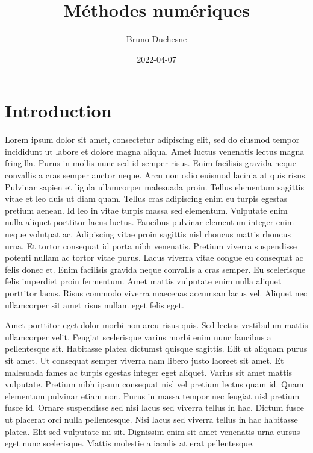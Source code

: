 \documentclass[
]{book}
\title{Méthodes numériques}
\author{Bruno Duchesne}
\date{2022-04-07}
\theoremstyle{definition}
\theoremstyle{definition}
\theoremstyle{definition}
\theoremstyle{definition}
\theoremstyle{remark}
\begin{document}
\maketitle

{
\setcounter{tocdepth}{1}
\tableofcontents
}
\hypertarget{introduction}{%
\chapter*{Introduction}\label{introduction}}

Lorem ipsum dolor sit amet, consectetur adipiscing elit, sed do eiusmod tempor incididunt ut labore et dolore magna aliqua. Amet luctus venenatis lectus magna fringilla. Purus in mollis nunc sed id semper risus. Enim facilisis gravida neque convallis a cras semper auctor neque. Arcu non odio euismod lacinia at quis risus. Pulvinar sapien et ligula ullamcorper malesuada proin. Tellus elementum sagittis vitae et leo duis ut diam quam. Tellus cras adipiscing enim eu turpis egestas pretium aenean. Id leo in vitae turpis massa sed elementum. Vulputate enim nulla aliquet porttitor lacus luctus. Faucibus pulvinar elementum integer enim neque volutpat ac. Adipiscing vitae proin sagittis nisl rhoncus mattis rhoncus urna. Et tortor consequat id porta nibh venenatis. Pretium viverra suspendisse potenti nullam ac tortor vitae purus. Lacus viverra vitae congue eu consequat ac felis donec et. Enim facilisis gravida neque convallis a cras semper. Eu scelerisque felis imperdiet proin fermentum. Amet mattis vulputate enim nulla aliquet porttitor lacus. Risus commodo viverra maecenas accumsan lacus vel. Aliquet nec ullamcorper sit amet risus nullam eget felis eget.

Amet porttitor eget dolor morbi non arcu risus quis. Sed lectus vestibulum mattis ullamcorper velit. Feugiat scelerisque varius morbi enim nunc faucibus a pellentesque sit. Habitasse platea dictumst quisque sagittis. Elit ut aliquam purus sit amet. Ut consequat semper viverra nam libero justo laoreet sit amet. Et malesuada fames ac turpis egestas integer eget aliquet. Varius sit amet mattis vulputate. Pretium nibh ipsum consequat nisl vel pretium lectus quam id. Quam elementum pulvinar etiam non. Purus in massa tempor nec feugiat nisl pretium fusce id. Ornare suspendisse sed nisi lacus sed viverra tellus in hac. Dictum fusce ut placerat orci nulla pellentesque. Nisi lacus sed viverra tellus in hac habitasse platea. Elit sed vulputate mi sit. Dignissim enim sit amet venenatis urna cursus eget nunc scelerisque. Mattis molestie a iaculis at erat pellentesque.
\end{document}
